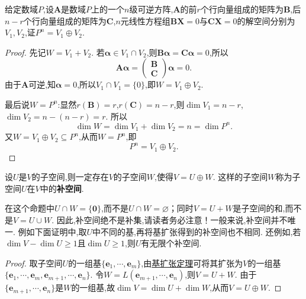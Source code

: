 \documentclass[../../main.tex]{subfiles}
\begin{document}
\begin{example}\label{example:561.16}
给定数域\(P\),设\(\boldsymbol{A}\)是数域\(P\)上的一个\(n\)级可逆方阵,\(\boldsymbol{A}\)的前\(r\)个行向量组成的矩阵为\(\boldsymbol{B}\),后\(n - r\)个行向量组成的矩阵为\(\boldsymbol{C}\),\(n\)元线性方程组\(\boldsymbol{B}\boldsymbol{X}=0\)与\(\boldsymbol{C}\boldsymbol{X}=0\)的解空间分别为\(V_1,V_2\),证\(P^n = V_1\oplus V_2\).
\end{example}
\begin{proof}
先记\(W = V_1 + V_2\). 若\(\boldsymbol{\alpha}\in V_1\cap V_2\),则\(\boldsymbol{B}\boldsymbol{\alpha}=\boldsymbol{C}\boldsymbol{\alpha}=0\),所以
\[
\boldsymbol{A}\boldsymbol{\alpha}=\begin{pmatrix}
\boldsymbol{B}\\
\boldsymbol{C}
\end{pmatrix}\boldsymbol{\alpha}=0.
\]
由于\(\boldsymbol{A}\)可逆,知\(\boldsymbol{\alpha}=0\),所以\(V_1\cap V_1 = \{0\}\),即\(W = V_1\oplus V_2\).

最后说\(W = P^n\):显然\(r(\boldsymbol{B}) = r\),\(r(\boldsymbol{C}) = n - r\),则\(\dim V_1 = n - r\),\(\dim V_2 = n-(n - r)=r\). 所以
\[
\dim W=\dim V_1+\dim V_2=n=\dim P^n.
\]
又\(W = V_1\oplus V_2\subseteq P^n\),从而\(W = P^n\),即
\[
P^n = V_1\oplus V_2.
\]  
\end{proof}


\begin{proposition}[任意子空间一定存在相应的补空间]\label{proposition:补空间}
设\(U\)是\(V\)的子空间,则一定存在\(V\)的子空间\(W\),使得\(V = U\oplus W\). 这样的子空间\(W\)称为子空间\(U\)在\(V\)中的\textbf{补空间}.
\end{proposition}
\begin{remark}
在这个命题中\(U\cap W = \{ \boldsymbol{0}\}\),而不是\(U\cap W=\varnothing\)；同时\(V = U + W\)是子空间的和,而不是\(V = U\cup W\). 因此,补空间绝不是补集,请读者务必注意！一般来说,补空间并不唯一. 例如下面证明中,取$U$中不同的基,再将基扩张得到的补空间也不相同.
还例如,若\(\dim V-\dim U\geq1\)且\(\dim U\geq1\),则\(U\)有无限个补空间.
\end{remark}
\begin{proof}
取子空间\(U\)的一组基\(\{\boldsymbol{e}_1,\cdots,\boldsymbol{e}_m\}\),由\hyperref[theorem:基扩充定理]{基扩张定理}可将其扩张为\(V\)的一组基\(\{\boldsymbol{e}_1,\cdots,\boldsymbol{e}_m,\boldsymbol{e}_{m + 1},\cdots,\boldsymbol{e}_n\}\). 令\(W = L(\boldsymbol{e}_{m + 1},\cdots,\boldsymbol{e}_n)\),则\(V = U+W\). 由于\(\{\boldsymbol{e}_{m + 1},\cdots,\boldsymbol{e}_n\}\)是\(W\)的一组基,故\(\dim V=\dim U+\dim W\),从而\(V = U\oplus W\). 
\end{proof}
\end{document}
